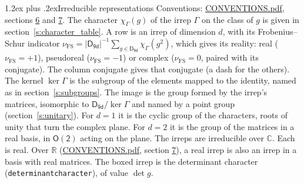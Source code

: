 \documentclass[10pt,a4paper]{article}
\makeatletter
\renewcommand\section{\@startsection{section}{1}{\z@}{-3ex plus -1ex minus -.2ex}%
  {1.2ex plus .2ex}{\normalfont\large\sffamily\bfseries\color{parttitle}}}
\numberwithin{equation}{section}
\newcommand{\grp}[1]{\mathsf{#1}}
\newcommand{\irchar}[1]{\chi_{#1}}
\newcommand{\fsind}{\nu_{\mathrm{FS}}}
\makeatother
\begin{document}
\section{Irreducible representations}\label{s:irreps}
Conventions: \href{../../CONVENTIONS.pdf}{CONVENTIONS.pdf}, sections \href{../../CONVENTIONS.pdf\#conv.6}{6} and \href{../../CONVENTIONS.pdf\#conv.7}{7}.
\leavevmode\label{n:function.character}\label{n:irrep.Gamma}The character $\irchar{\Gamma}(g)$ of the irrep $\Gamma$ on the class of $g$ is given in section~\ref{s:character_table}.
\leavevmode\label{n:index.dimension}\label{n:index.frobenius}\label{n:head.irrep}\label{n:head.reality}A row is an irrep of dimension $d$, with its Frobenius--Schur indicator $\fsind = |\grp{D_{9d}}|^{-1}\allowbreak\sum_{g\in\grp{D_{9d}}}\irchar{\Gamma}(g^2)$, which gives its reality: real ($\fsind = +1$), pseudoreal ($\fsind = -1$) or complex ($\fsind = 0$, paired with its conjugate). \label{n:head.conjugate}The column conjugate gives that conjugate (a dash for the others). \label{n:head.kernel}The kernel $\ker\Gamma$ is the subgroup of the elements mapped to the identity, named as in section~\ref{s:subgroups}. \label{n:head.image}The image is the group formed by the irrep's matrices, isomorphic to $\grp{D_{9d}}/\ker\Gamma$ and named by a point group (section~\ref{s:unitary}). For $d = 1$ it is the cyclic group of the characters, roots of unity that turn the complex plane. For $d = 2$ it is the group of the matrices in a real basis, in $\grp{O(2)}$ acting on the plane. The irreps are irreducible over $\mathbb{C}$. Each is real. Over $\mathbb{R}$ (\href{../../CONVENTIONS.pdf}{CONVENTIONS.pdf}, section \href{../../CONVENTIONS.pdf\#conv.7}{7}), a real irrep is also an irrep in a basis with real matrices. \label{n:mark.determinant}The boxed irrep is the determinant character (\texttt{determinantcharacter}), of value $\det g$.
\setlength{\emergencystretch}{2em}\par\setlength{\emergencystretch}{0pt}
\end{document}
